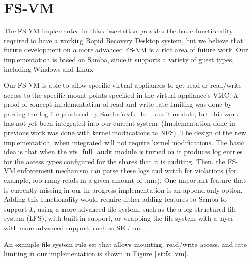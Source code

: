 \section{FS-VM}
\label{sec:fs-vm-implementation}

The FS-VM implemented in this dissertation provides the basic functionality required to have a working Rapid Recovery Desktop system, but we believe that future development on a more advanced FS-VM is a rich area of future work. Our implementation is based on Samba, since it supports a variety of guest types, including Windows and Linux. 

Our FS-VM is able to allow specific virtual appliances to get read or read/write access to the specific mount points specified in the virtual appliance's VMC. A proof of concept implementation of read and write rate-limiting was done by parsing the log file produced by Samba's vfs\_full\_audit module, but this work has not yet been integrated into our current system. (Implementation done in previous work\cite{rapid_recovery_paper_05} was done with kernel modfications to NFS). The design of the new implementation, when integrated will not require kernel modifications. The basic idea is that when the  vfs\_full\_audit module is turned on it produces log entries for the access types configured for the shares that it is auditing. Then, the FS-VM enforcement mechanism can parse these logs and watch for violations (for example, too many reads in a given amount of time). One important feature that is currently missing in our in-progress implementation is an append-only option. Adding this functionality would require either adding features to Samba to support it, using a more advanced file system, such as the a log-structured file system (LFS)\cite{rosenblum_lfs_1992 }, with built-in support, or wrapping the file system with a layer with more advanced support, such as SELinux \cite{smalley_2001}.

An example file system rule set that allows mounting, read/write access, and rate limiting in our implementation is shown in Figure \ref{lst:fs_vm}.

